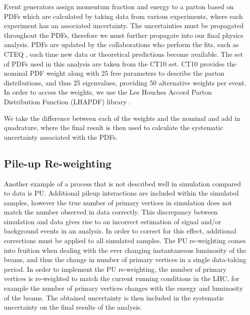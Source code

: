 Event generators assign momentum fraction and energy to a parton based on PDFs which are calculated by taking data from various experiments, where each experiment has an associated uncertainty. The uncertainties must be propagated throughout the PDFs, therefore we must further propagate into our final physics analysis. PDFs are updated by the collaborations who perform the fits, such as CTEQ \cite{PhysRevD.78.013004}, each time new data or theoretical predictions become available. The set of PDFs used in this analysis are taken from the CT10 \cite{PhysRevD.89.033009} set. CT10 provides the nominal PDF weight along with 25 free parameters to describe the parton distributions, and thus 25 eigenvalues, providing 50 alternative weights per event. In order to access the weights, we use the Les Houches Accord Parton Distribution Function (LHAPDF) library \cite{Whalley:2005nh}. 

We take the difference between each of the weights and the nominal and add in quadrature, where the final result is then used to calculate the systematic uncertainty associated with the PDFs. %



\subsection{Pile-up Re-weighting} \label{subsec-PUReweightingUncertainties}

Another example of a process that is not described well in simulation compared to data is PU. Additional pileup interactions are included within the simulated samples, however the true number of primary vertices in simulation does not match the number observed in data correctly. This discrepancy between simulation and data gives rise to an incorrect estimation of signal and/or background events in an analysis. In order to correct for this effect, additional corrections must be applied to all simulated samples. The PU re-weighting comes into fruition when dealing with the ever changing instantaneous luminosity of the beams, and thus the change in number of primary vertices in a single data-taking period. In order to implement the PU re-weighting, the number of primary vertices is re-weighted to match the current running conditions in the LHC, for example the number of primary vertices changes with the energy and luminosity of the beams. The obtained uncertainty is then included in the systematic uncertainty on the final results of the analysis. 

